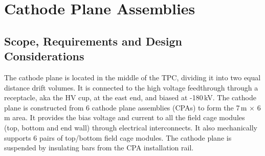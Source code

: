 


\section{Cathode Plane Assemblies}


\subsection{Scope, Requirements and Design Considerations}

The cathode plane is located in the middle of the TPC, dividing it into two equal distance drift volumes.  It is connected to the high voltage feedthrough through a receptacle, aka the HV cup, at the east end, and biased at -180\,kV.  The cathode plane is constructed from 6 cathode plane assemblies (CPAs) to form the 7\,m $\times$ 6\,m area.  It provides the bias voltage and current to all the field cage modules (top, bottom and end wall) through electrical interconnects.  It also mechanically supports 6 pairs of top/bottom field cage modules.
The cathode plane is suspended by insulating bars from the CPA installation rail.



